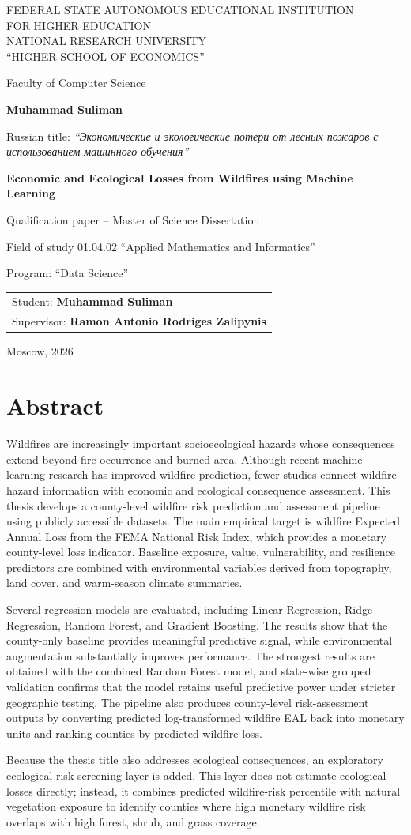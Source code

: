 \documentclass[12pt,a4paper]{report}
\renewcommand{\maketitle}{%
\begin{titlepage}
\centering

{\scshape\large
FEDERAL STATE AUTONOMOUS EDUCATIONAL INSTITUTION \\
FOR HIGHER EDUCATION \\
NATIONAL RESEARCH UNIVERSITY \\
``HIGHER SCHOOL OF ECONOMICS''
\par}

\vspace{1cm}

{\large Faculty of Computer Science\par}

\vspace{1cm}

{\Large \textbf{Muhammad Suliman}\par}

\vspace{1cm}

{\large Russian title: \textit{``Экономические и экологические потери от лесных пожаров с использованием машинного обучения''}\par}

\vspace{0.5cm}

{\Large \textbf{Economic and Ecological Losses from Wildfires using Machine Learning}\par}

\vspace{1cm}

{\large Qualification paper -- Master of Science Dissertation\par}

\vspace{0.5cm}

{\large Field of study 01.04.02 ``Applied Mathematics and Informatics''\par}
{\large Program: ``Data Science''\par}

\vspace{0.5cm}

\begin{flushright}
\begin{tabularx}{0.5\textwidth}{X}
Student: \textbf{Muhammad Suliman} \\[0.5cm]
Supervisor: \textbf{Ramon Antonio Rodriges Zalipynis} \\
\end{tabularx}
\end{flushright}

\vfill

{\large Moscow, 2026\par}

\end{titlepage}
}
\begin{document}

\maketitle
\chapter*{Abstract}

Wildfires are increasingly important socioecological hazards whose consequences extend beyond fire occurrence and burned area. Although recent machine-learning research has improved wildfire prediction, fewer studies connect wildfire hazard information with economic and ecological consequence assessment. This thesis develops a county-level wildfire risk prediction and assessment pipeline using publicly accessible datasets. The main empirical target is wildfire Expected Annual Loss from the FEMA National Risk Index, which provides a monetary county-level loss indicator. Baseline exposure, value, vulnerability, and resilience predictors are combined with environmental variables derived from topography, land cover, and warm-season climate summaries.

Several regression models are evaluated, including Linear Regression, Ridge Regression, Random Forest, and Gradient Boosting. The results show that the county-only baseline provides meaningful predictive signal, while environmental augmentation substantially improves performance. The strongest results are obtained with the combined Random Forest model, and state-wise grouped validation confirms that the model retains useful predictive power under stricter geographic testing. The pipeline also produces county-level risk-assessment outputs by converting predicted log-transformed wildfire EAL back into monetary units and ranking counties by predicted wildfire loss.

Because the thesis title also addresses ecological consequences, an exploratory ecological risk-screening layer is added. This layer does not estimate ecological losses directly; instead, it combines predicted wildfire-risk percentile with natural vegetation exposure to identify counties where high monetary wildfire risk overlaps with high forest, shrub, and grass coverage.
\end{document}
